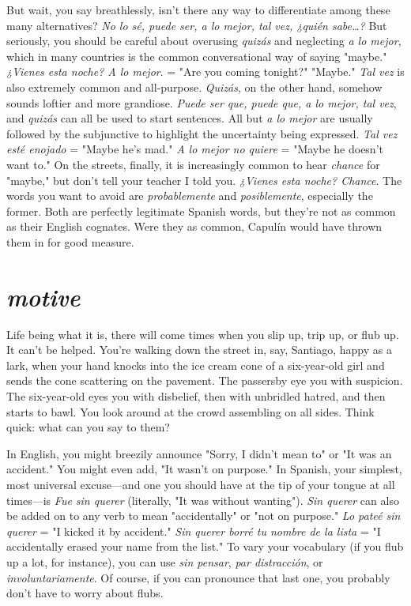 But wait, you say breathlessly, isn't there any way to differentiate among these many alternatives? \emph{No lo sé, puede ser, a lo mejor, tal vez, ¿quién
sabe\ldots{}?}
But seriously, you should be careful about
overusing \emph{quizás} and neglecting \emph{a lo mejor}, which in many countries
is the common conversational way of saying "maybe." \emph{¿Vienes esta
noche? A lo mejor}. = "Are you coming tonight?" "Maybe." \emph{Tal vez} is
also extremely common and all-purpose. \emph{Quizás}, on the other hand,
somehow sounds loftier and more grandiose. \emph{Puede ser que, puede
que, a lo mejor, tal vez}, and \emph{quizás} can all be used to start sentences.
All but \emph{a lo mejor} are usually followed by the subjunctive to highlight
the uncertainty being expressed. \emph{Tal vez esté enojado} = "Maybe he's
mad." \emph{A lo mejor no quiere} = "Maybe he doesn't want to." On the
streets, finally, it is increasingly common to hear \emph{chance} for "maybe,"
but don't tell your teacher I told you. \emph{¿Vienes esta noche? Chance}. The
words you want to avoid are \emph{probablemente} and \emph{posiblemente}, especially the former. Both are perfectly legitimate Spanish words, but
they're not as common as their English cognates. Were they as common, Capulín would have thrown them in for good measure.

\section{\emph{motive}}

Life being what it is, there will come times when you slip up,
trip up, or flub up. It can't be helped. You're walking down the street
in, say, Santiago, happy as a lark, when your hand knocks into the ice
cream cone of a six-year-old girl and sends the cone scattering on the
pavement. The passersby eye you with suspicion. The six-year-old eyes
you with disbelief, then with unbridled hatred, and then starts to bawl.
You look around at the crowd assembling on all sides. Think quick:
what can you say to them?

In English, you might breezily announce "Sorry, I didn't mean
to" or "It was an accident." You might even add, "It wasn't on purpose." In Spanish, your simplest, most universal excuse---and one you
should have at the tip of your tongue at all times---is \emph{Fue sin querer}
(literally, "It was without wanting"). \emph{Sin querer} can also be added on
to any verb to mean "accidentally" or "not on purpose." \emph{Lo pateé sin
querer} = "I kicked it by accident." \emph{Sin querer borré tu nombre de la
lista} = "I accidentally erased your name from the list." To vary your
vocabulary (if you flub up a lot, for instance), you can use \emph{sin pensar},
\emph{par distracción}, or \emph{involuntariamente}. Of course, if you can pronounce
that last one, you probably don't have to worry about flubs.

